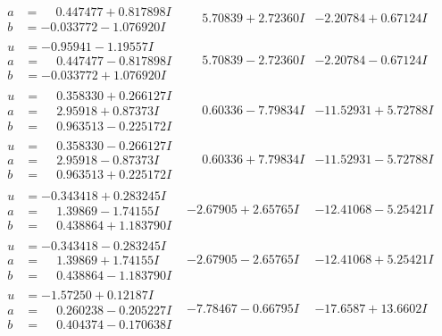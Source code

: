 \documentclass[1p]{elsarticle_modified}
\theoremstyle{definition}
\begin{document}
$$\begin{array}{c|c|c}
\begin{aligned}
a &= \phantom{-}0.447477 + 0.817898 I \\
b &= -0.033772 - 1.076920 I\end{aligned}
 & \phantom{-}5.70839 + 2.72360 I & -2.20784 + 0.67124 I \\ \hline\begin{aligned}
u &= -0.95941 - 1.19557 I \\
a &= \phantom{-}0.447477 - 0.817898 I \\
b &= -0.033772 + 1.076920 I\end{aligned}
 & \phantom{-}5.70839 - 2.72360 I & -2.20784 - 0.67124 I \\ \hline\begin{aligned}
u &= \phantom{-}0.358330 + 0.266127 I \\
a &= \phantom{-}2.95918 + 0.87373 I \\
b &= \phantom{-}0.963513 - 0.225172 I\end{aligned}
 & \phantom{-}0.60336 - 7.79834 I & -11.52931 + 5.72788 I \\ \hline\begin{aligned}
u &= \phantom{-}0.358330 - 0.266127 I \\
a &= \phantom{-}2.95918 - 0.87373 I \\
b &= \phantom{-}0.963513 + 0.225172 I\end{aligned}
 & \phantom{-}0.60336 + 7.79834 I & -11.52931 - 5.72788 I \\ \hline\begin{aligned}
u &= -0.343418 + 0.283245 I \\
a &= \phantom{-}1.39869 - 1.74155 I \\
b &= \phantom{-}0.438864 + 1.183790 I\end{aligned}
 & -2.67905 + 2.65765 I & -12.41068 - 5.25421 I \\ \hline\begin{aligned}
u &= -0.343418 - 0.283245 I \\
a &= \phantom{-}1.39869 + 1.74155 I \\
b &= \phantom{-}0.438864 - 1.183790 I\end{aligned}
 & -2.67905 - 2.65765 I & -12.41068 + 5.25421 I \\ \hline\begin{aligned}
u &= -1.57250 + 0.12187 I \\
a &= \phantom{-}0.260238 - 0.205227 I \\
b &= \phantom{-}0.404374 - 0.170638 I\end{aligned}
 & -7.78467 - 0.66795 I & -17.6587 + 13.6602 I \\ \hline\begin{aligned}

\end{aligned}
\end{array}$$
\end{document}
